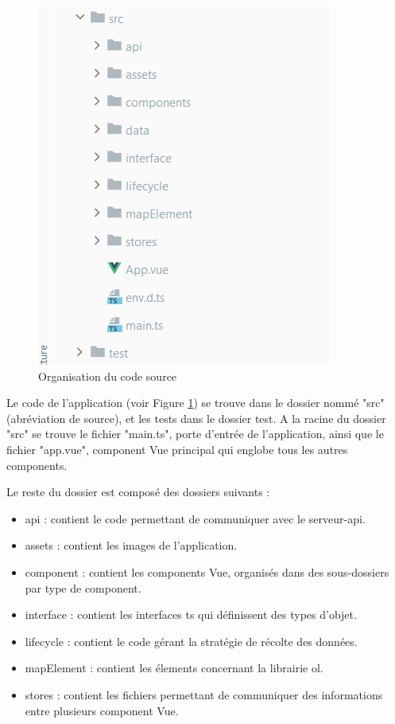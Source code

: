 \documentclass[
    iai, %
    il, %
]{heig-tb}
\begin{document}
\begin{figure}[h]
    \centering
    \includegraphics[scale=0.7]{frontend-source-organisation.png}
    \caption{Organisation du code source}
    \label{fig:fichier-source}
\end{figure}

Le code de l'application (voir Figure \ref{fig:fichier-source}) se trouve dans le dossier nommé "src" (abréviation de source), et les tests dans le dossier test.
A la racine du dossier "src" se trouve le fichier "main.ts", porte d'entrée de l'application,
ainsi que le fichier "app.vue", component Vue principal qui englobe tous les autres components.

Le reste du dossier est composé des dossiers suivants :
\begin{itemize}
    \item api : contient le code permettant de communiquer avec le serveur-api.
    \item assets : contient les images de l'application.
    \item component : contient les components Vue, organisés dans des sous-dossiers par type de component.
    \item interface : contient les interfaces \gls{ts} qui définissent des types d'objet.
    \item lifecycle : contient le code gérant la stratégie de récolte des données.
    \item mapElement : contient les élements concernant la librairie \gls{ol}.
    \item stores : contient les fichiers permettant de communiquer des informations entre plusieurs component Vue.
\end{itemize}
\end{document}
